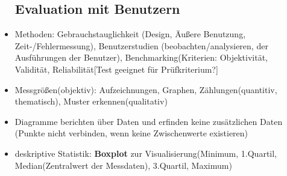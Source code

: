 \documentclass[12pt,landscape]{article}
\begin{document}
\begin{multicols}{3}
\begin{itemize}
\subsection{Evaluation mit Benutzern}
\item Methoden: Gebrauchstauglichkeit (Design, Äußere Benutzung, Zeit-/Fehlermessung), Benutzerstudien (beobachten/analysieren, der Ausführungen der Benutzer), Benchmarking(Kriterien: Objektivität, Validität, Reliabilität[Test geeignet für Prüfkriterium?]
\item Messgrößen(objektiv): Aufzeichnungen, Graphen, Zählungen(quantitiv, thematisch), Muster erkennen(qualitativ)
\item Diagramme berichten über Daten und erfinden keine zusätzlichen Daten (Punkte nicht verbinden, wenn keine Zwischenwerte existieren)
\item deskriptive Statistik: \textbf{Boxplot} zur Visualisierung(Minimum, 1.Quartil, Median(Zentralwert der Messdaten), 3.Quartil, Maximum)

\end{itemize}
\end{multicols}
\end{document}
